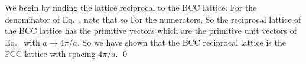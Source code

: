 {	We begin by finding the lattice reciprocal to the BCC lattice.  For the denominator of Eq.~, note that
	so
	For the numerators,
	So the reciprocal lattice of the BCC lattice has the primitive vectors
	which are the primitive unit vectors of Eq.~ with $a \to 4\pi / a$.  So we have shown that the BCC reciprocal lattice is the FCC lattice with spacing $4\pi / a$. \qed
	
}
